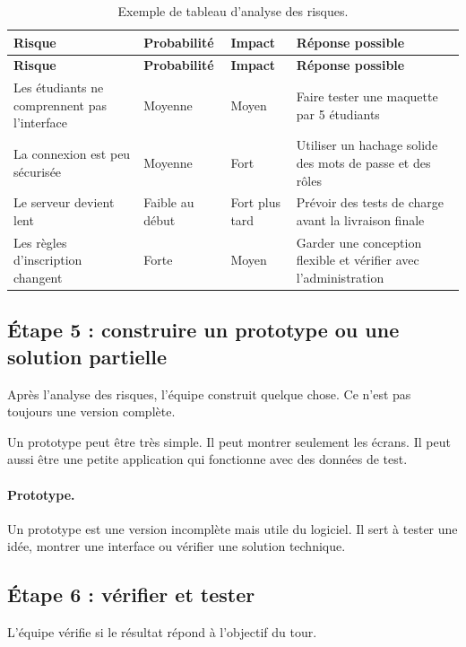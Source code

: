 \documentclass[12pt,a4paper]{article}
\begin{document}
\begin{longtable}{p{} p{} p{} p{}}
\caption{Exemple de tableau d'analyse des risques.}\\
\toprule
\textbf{Risque} & \textbf{Probabilité} & \textbf{Impact} & \textbf{Réponse possible} \\
\midrule
\endfirsthead
\toprule
\textbf{Risque} & \textbf{Probabilité} & \textbf{Impact} & \textbf{Réponse possible} \\
\midrule
\endhead
Les étudiants ne comprennent pas l'interface & Moyenne & Moyen & Faire tester une maquette par 5 étudiants \\
La connexion est peu sécurisée & Moyenne & Fort & Utiliser un hachage solide des mots de passe et des rôles \\
Le serveur devient lent & Faible au début & Fort plus tard & Prévoir des tests de charge avant la livraison finale \\
Les règles d'inscription changent & Forte & Moyen & Garder une conception flexible et vérifier avec l'administration \\
\bottomrule
\end{longtable}

\subsection{Étape 5 : construire un prototype ou une solution partielle}

Après l'analyse des risques, l'équipe construit quelque chose. Ce n'est pas toujours une version complète.

Un prototype peut être très simple. Il peut montrer seulement les écrans. Il peut aussi être une petite application qui fonctionne avec des données de test.

\paragraph{Prototype.}
Un prototype est une version incomplète mais utile du logiciel. Il sert à tester une idée, montrer une interface ou vérifier une solution technique.

\subsection{Étape 6 : vérifier et tester}

L'équipe vérifie si le résultat répond à l'objectif du tour.
\end{document}

